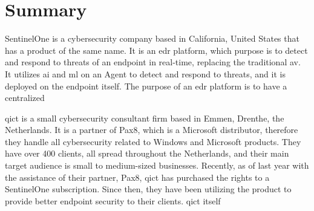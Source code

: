 \chapter*{Summary}

SentinelOne is a cybersecurity company based in California, United States that has a product of the same name. It is an
\acrshort{edr} platform, which purpose is to detect and respond to threats of an endpoint in real-time, replacing the
traditional \acrshort{av}. It utilizes \acrshort{ai} and \acrshort{ml} on an Agent to detect and respond to threats, and it is
deployed on the endpoint itself. The purpose of an \acrshort{edr} platform is to have a centralized

\acrshort{qict} is a small cybersecurity consultant firm based in Emmen, Drenthe, the Netherlands. It is a partner of Pax8,
which is a Microsoft distributor, therefore they handle all cybersecurity related to Windows and Microsoft products. They
have over 400 clients, all spread throughout the Netherlands, and their main target audience is small to medium-sized
businesses. Recently, as of last year with the assistance of their partner, Pax8, \acrshort{qict} has purchased the rights
to a SentinelOne subscription. Since then, they have been utilizing the product to provide better endpoint security to their clients.
\acrshort{qict} itself
